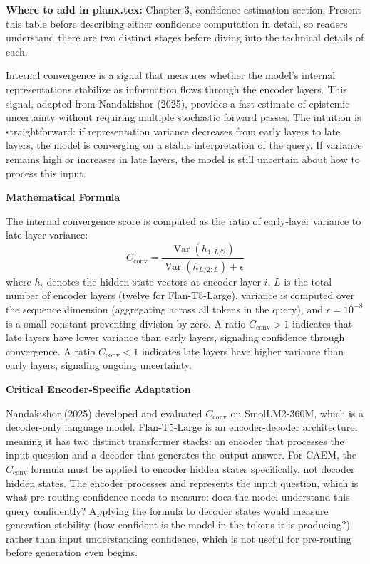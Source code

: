 \documentclass[11pt,a4paper]{article}
\newcommand{\architecturebox}[2]{%
\begin{tcolorbox}[enhanced,breakable,
  colback=LightTeal,colframe=Teal,boxrule=1.5pt,arc=4pt,
  left=8pt,right=8pt,top=6pt,bottom=6pt,
  title={\bfseries\small\color{white}#1},
  attach boxed title to top left={yshift=-2mm,xshift=6mm},
  boxed title style={colback=Teal,arc=3pt,boxrule=0pt,
    left=4pt,right=4pt,top=2pt,bottom=2pt}]
#2
\end{tcolorbox}}
\newcommand{\Cconv}{C_{\text{conv}}}
\begin{document}
{\textbf{Where to add in planx.tex:} Chapter 3, confidence estimation section. Present this table before describing either confidence computation in detail, so readers understand there are two distinct stages before diving into the technical details of each.
}

\architecturebox{ARCHITECTURE UPDATE 2: Internal Convergence Signal $\Cconv$}{
Internal convergence is a signal that measures whether the model's internal representations stabilize as information flows through the encoder layers. This signal, adapted from Nandakishor (2025), provides a fast estimate of epistemic uncertainty without requiring multiple stochastic forward passes. The intuition is straightforward: if representation variance decreases from early layers to late layers, the model is converging on a stable interpretation of the query. If variance remains high or increases in late layers, the model is still uncertain about how to process this input.

\textbf{Mathematical Formula}

The internal convergence score is computed as the ratio of early-layer variance to late-layer variance:
\[
\Cconv = \frac{\operatorname{Var}(h_{1:L/2})}{\operatorname{Var}(h_{L/2:L}) + \epsilon}
\]
where $h_i$ denotes the hidden state vectors at encoder layer $i$, $L$ is the total number of encoder layers (twelve for Flan-T5-Large), variance is computed over the sequence dimension (aggregating across all tokens in the query), and $\epsilon = 10^{-8}$ is a small constant preventing division by zero. A ratio $\Cconv > 1$ indicates that late layers have lower variance than early layers, signaling confidence through convergence. A ratio $\Cconv < 1$ indicates late layers have higher variance than early layers, signaling ongoing uncertainty.

\textbf{Critical Encoder-Specific Adaptation}

Nandakishor (2025) developed and evaluated $\Cconv$ on SmolLM2-360M, which is a decoder-only language model. Flan-T5-Large is an encoder-decoder architecture, meaning it has two distinct transformer stacks: an encoder that processes the input question and a decoder that generates the output answer. For CAEM, the $\Cconv$ formula must be applied to encoder hidden states specifically, not decoder hidden states. The encoder processes and represents the input question, which is what pre-routing confidence needs to measure: does the model understand this query confidently? Applying the formula to decoder states would measure generation stability (how confident is the model in the tokens it is producing?) rather than input understanding confidence, which is not useful for pre-routing before generation even begins.

}
\end{document}
